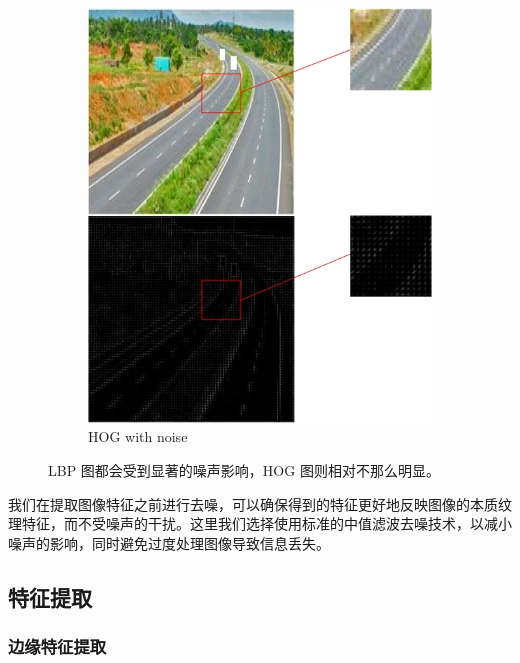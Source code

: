 \documentclass[a4paper, 10pt]{article}
\begin{document}
\begin{figure}[htbp]
\begin{subfigure}{0.3\textwidth}
			\includegraphics[width=\linewidth]{picture/HOG noise}
			\caption{HOG with noise}
			\label{fig: HOG noise}
		\end{subfigure}	
		
		\caption{
			\label{fig: HOG and LBP noise}
			LBP 图都会受到显著的噪声影响，HOG 图则相对不那么明显。
		}
	\end{figure}
	
	我们在提取图像特征之前进行去噪，可以确保得到的特征更好地反映图像的本质纹理特征，而不受噪声的干扰。这里我们选择使用标准的中值滤波去噪技术，以减小噪声的影响，同时避免过度处理图像导致信息丢失。
	
	\subsection{特征提取}
	
	\subsubsection{边缘特征提取}
	
\end{document}
